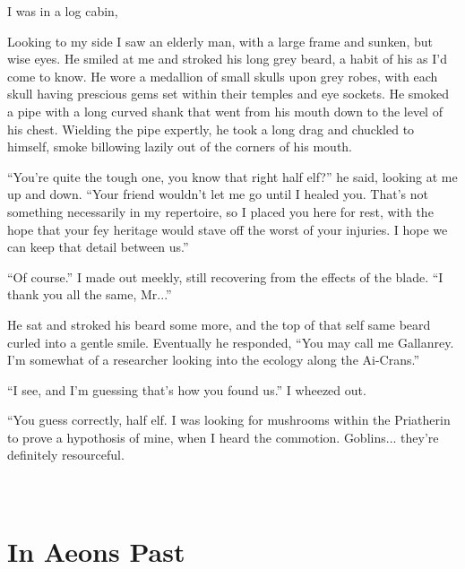 \documentclass[12pt, a4paper]{book}
\begin{document}
I was in a log cabin, 

Looking to my side I saw an elderly man, with a large frame and sunken, but wise eyes. He smiled at me and stroked his long grey beard, a habit of his as I'd come to know. He wore a medallion of small skulls upon grey robes, with each skull having prescious gems set within their temples and eye sockets. He smoked a pipe with a long curved shank that went from his mouth down to the level of his chest. Wielding the pipe expertly, he took a long drag and chuckled to himself, smoke billowing lazily out of the corners of his mouth.

``You're quite the tough one, you know that right half elf?'' he said, looking at me up and down. ``Your friend wouldn't let me go until I healed you. That's not something necessarily in my repertoire, so I placed you here for rest, with the hope that your fey heritage would stave off  the worst of your injuries. I hope we can keep that detail between us.''

``Of course.'' I made out meekly, still recovering from the effects of the blade. ``I thank you all the same, Mr...''

He sat and stroked his beard some more, and the top of that self same beard curled into a gentle smile. Eventually he responded, ``You may call me Gallanrey. I'm somewhat of a researcher looking into the ecology along the Ai-Crans.''

``I see, and I'm guessing that's how you found us.'' I wheezed out.

``You guess correctly, half elf. I was looking for mushrooms within the Priatherin to prove a hypothosis of mine, when I heard the commotion. Goblins... they're definitely resourceful.


\part*{
\setlength{\fboxsep}{3pt}%
\setlength{\fboxrule}{3pt}%
~\\[1cm]
In Aeons Past
}
\setcounter{chapter}{0}
\end{document}
